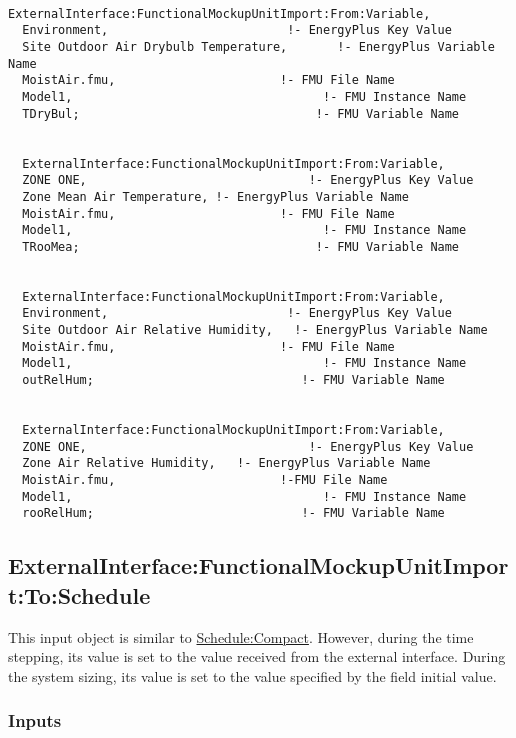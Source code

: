 \begin{lstlisting}

ExternalInterface:FunctionalMockupUnitImport:From:Variable,
  Environment,                         !- EnergyPlus Key Value
  Site Outdoor Air Drybulb Temperature,       !- EnergyPlus Variable Name
  MoistAir.fmu,                       !- FMU File Name
  Model1,                                   !- FMU Instance Name
  TDryBul;                                 !- FMU Variable Name


  ExternalInterface:FunctionalMockupUnitImport:From:Variable,
  ZONE ONE,                               !- EnergyPlus Key Value
  Zone Mean Air Temperature, !- EnergyPlus Variable Name
  MoistAir.fmu,                       !- FMU File Name
  Model1,                                   !- FMU Instance Name
  TRooMea;                                 !- FMU Variable Name


  ExternalInterface:FunctionalMockupUnitImport:From:Variable,
  Environment,                         !- EnergyPlus Key Value
  Site Outdoor Air Relative Humidity,   !- EnergyPlus Variable Name
  MoistAir.fmu,                       !- FMU File Name
  Model1,                                   !- FMU Instance Name
  outRelHum;                             !- FMU Variable Name


  ExternalInterface:FunctionalMockupUnitImport:From:Variable,
  ZONE ONE,                               !- EnergyPlus Key Value
  Zone Air Relative Humidity,   !- EnergyPlus Variable Name
  MoistAir.fmu,                       !-FMU File Name
  Model1,                                   !- FMU Instance Name
  rooRelHum;                             !- FMU Variable Name
\end{lstlisting}

\subsection{ExternalInterface:FunctionalMockupUnitImport:To:Schedule}\label{externalinterfacefunctionalmockupunitimporttoschedule}

This input object is similar to \hyperref[schedulecompact]{Schedule:Compact}. However, during the time stepping, its value is set to the value received from the external interface. During the system sizing, its value is set to the value specified by the field initial value.

\subsubsection{Inputs}\label{inputs-6-009}

